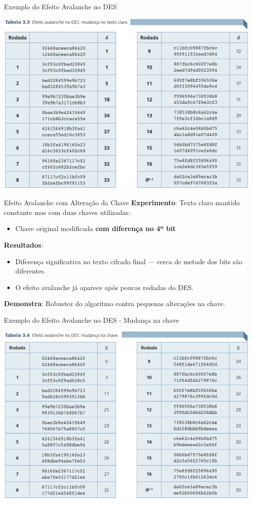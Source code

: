 \begin{frame}{Exemplo do Efeito Avalanche no DES}


\centering
    \includegraphics[width=0.7\linewidth]{Figuras/des-efeito-avalanche.png}
    
\end{frame}

\begin{frame}{Efeito Avalanche com Alteração da Chave}
\textbf{Experimento}: Texto claro mantido constante mas com duas chaves utilizadas:
        \begin{itemize}
            \item Chave original modificada \textbf{com diferença no 4º bit}
        \end{itemize}
\textbf{Resultados}:
        \begin{itemize}
            \item Diferença significativa no texto cifrado final — cerca de metade dos bits são diferentes.
            \item O efeito avalanche já aparece após poucas rodadas do DES.
        \end{itemize}
 \textbf{Demonstra}: Robustez do algoritmo contra pequenas alterações na chave.

\end{frame}

\begin{frame}{Exemplo do Efeito Avalanche no DES - Mudança na chave}


\centering
    \includegraphics[width=0.7\linewidth]{Figuras/des-efeito-avalanche-chave.png}
    
\end{frame}

